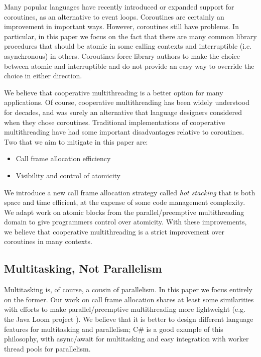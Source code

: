 \documentclass[a4paper,UKenglish,cleveref, autoref]{lipics-v2019}
\begin{document}
Many popular languages have recently introduced or expanded support for coroutines, as an alternative to event loops.
Coroutines are certainly an improvement in important ways.
However, coroutines still have problems.
In particular, in this paper we focus on the fact that there are many common library procedures that should be atomic in some calling contexts and interruptible (i.e. asynchronous) in others.
Coroutines force library authors to make the choice between atomic and interruptible and do not provide an easy way to override the choice in either direction.

We believe that cooperative multithreading is a better option for many applications.
Of course, cooperative multithreading has been widely understood for decades, and was surely an alternative that language designers considered when they chose coroutines.
Traditional implementations of cooperative multithreading have had some important disadvantages relative to coroutines.
Two that we aim to mitigate in this paper are:
\begin{itemize}
\item Call frame allocation efficiency
\item Visibility and control of atomicity
\end{itemize}

We introduce a new call frame allocation strategy called \emph{hot stacking} that is both space and time efficient, at the expense of some code management complexity.
We adapt work on atomic blocks from the parallel{\slash}preemptive multithreading domain to give programmers control over atomicity.
With these improvements, we believe that cooperative multithreading is a strict improvement over coroutines in many contexts.

\subsection{Multitasking, Not Parallelism}

Multitasking is, of course, a cousin of parallelism.
In this paper we focus entirely on the former.
Our work on call frame allocation shares at least some similarities with efforts to make parallel{\slash}preemptive multithreading more lightweight (e.g. the Java Loom project \cite{Pressler2017}).
We believe that it is better to design different language features for multitasking and parallelism; C\# is a good example of this philosophy, with async{\slash}await for multitasking and easy integration with worker thread pools for parallelism.
\end{document}
